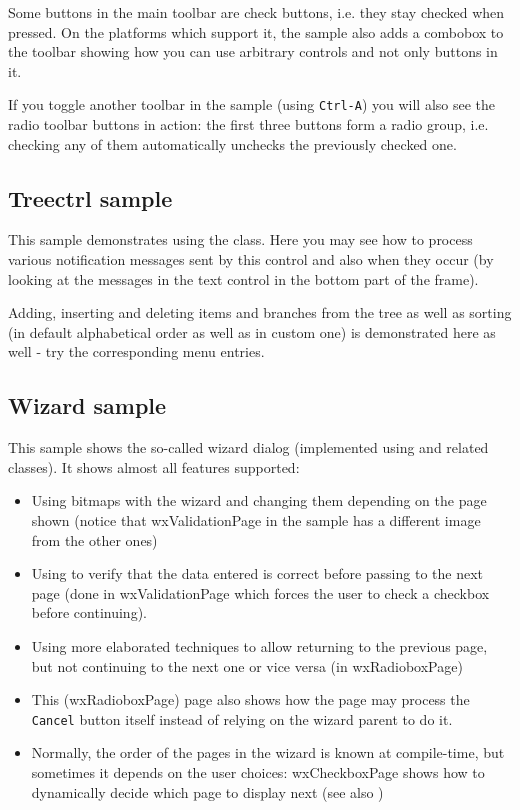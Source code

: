 Some buttons in the main toolbar are check buttons, i.e. they stay checked when
pressed. On the platforms which support it, the sample also adds a combobox
to the toolbar showing how you can use arbitrary controls and not only buttons
in it.

If you toggle another toolbar in the sample (using {\tt Ctrl-A}) you will also
see the radio toolbar buttons in action: the first three buttons form a radio
group, i.e. checking any of them automatically unchecks the previously
checked one.


\subsection{Treectrl sample}\label{sampletreectrl}

This sample demonstrates using the  class. Here
you may see how to process various notification messages sent by this control
and also when they occur (by looking at the messages in the text control in
the bottom part of the frame).

Adding, inserting and deleting items and branches from the tree as well as
sorting (in default alphabetical order as well as in custom one) is
demonstrated here as well - try the corresponding menu entries.


\subsection{Wizard sample}\label{samplewizard}

This sample shows the so-called wizard dialog (implemented using
 and related classes). It shows almost all
features supported:

\begin{itemize}\itemsep=0pt
\item Using bitmaps with the wizard and changing them depending on the page
shown (notice that wxValidationPage in the sample has a different image from
the other ones)
\item Using 
to verify that the data entered is correct before passing to the next page
(done in wxValidationPage which forces the user to check a checkbox before
continuing).
\item Using more elaborated techniques to allow returning to the previous
page, but not continuing to the next one or vice versa (in wxRadioboxPage)
\item This (wxRadioboxPage) page also shows how the page may process the {\tt
Cancel} button itself instead of relying on the wizard parent to do it.
\item Normally, the order of the pages in the wizard is known at compile-time,
but sometimes it depends on the user choices: wxCheckboxPage shows how to
dynamically decide which page to display next (see also
)
\end{itemize}

